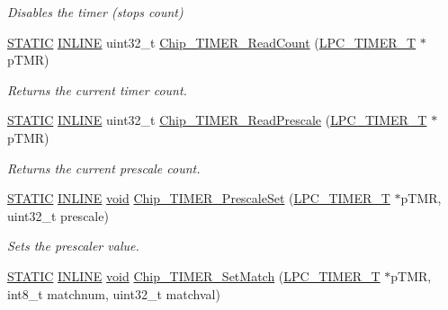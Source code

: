 \begin{DoxyCompactItemize}
\begin{DoxyCompactList}\small\item\em Disables the timer (stops count) \end{DoxyCompactList}\item 
\hyperlink{group__LPC__Types__Public__Macros_ga10b2d890d871e1489bb02b7e70d9bdfb}{S\-T\-A\-T\-I\-C} \hyperlink{group__LPC__Types__Public__Types_ga2eb6f9e0395b47b8d5e3eeae4fe0c116}{I\-N\-L\-I\-N\-E} uint32\-\_\-t \hyperlink{group__TIMER__17XX__40XX_ga6050d4da70d679696b3af922b8c1a6ac}{Chip\-\_\-\-T\-I\-M\-E\-R\-\_\-\-Read\-Count} (\hyperlink{structLPC__TIMER__T}{L\-P\-C\-\_\-\-T\-I\-M\-E\-R\-\_\-\-T} $\ast$p\-T\-M\-R)
\begin{DoxyCompactList}\small\item\em Returns the current timer count. \end{DoxyCompactList}\item 
\hyperlink{group__LPC__Types__Public__Macros_ga10b2d890d871e1489bb02b7e70d9bdfb}{S\-T\-A\-T\-I\-C} \hyperlink{group__LPC__Types__Public__Types_ga2eb6f9e0395b47b8d5e3eeae4fe0c116}{I\-N\-L\-I\-N\-E} uint32\-\_\-t \hyperlink{group__TIMER__17XX__40XX_ga52328278a0f1326c6ce7dc210ad010d3}{Chip\-\_\-\-T\-I\-M\-E\-R\-\_\-\-Read\-Prescale} (\hyperlink{structLPC__TIMER__T}{L\-P\-C\-\_\-\-T\-I\-M\-E\-R\-\_\-\-T} $\ast$p\-T\-M\-R)
\begin{DoxyCompactList}\small\item\em Returns the current prescale count. \end{DoxyCompactList}\item 
\hyperlink{group__LPC__Types__Public__Macros_ga10b2d890d871e1489bb02b7e70d9bdfb}{S\-T\-A\-T\-I\-C} \hyperlink{group__LPC__Types__Public__Types_ga2eb6f9e0395b47b8d5e3eeae4fe0c116}{I\-N\-L\-I\-N\-E} \hyperlink{Paradigm_2Tern__EE_2small_2portmacro_8h_a14d32f8130d3c0b212cfc751730b5b49}{void} \hyperlink{group__TIMER__17XX__40XX_gaa2483e6483702140e11de3183d5271f9}{Chip\-\_\-\-T\-I\-M\-E\-R\-\_\-\-Prescale\-Set} (\hyperlink{structLPC__TIMER__T}{L\-P\-C\-\_\-\-T\-I\-M\-E\-R\-\_\-\-T} $\ast$p\-T\-M\-R, uint32\-\_\-t prescale)
\begin{DoxyCompactList}\small\item\em Sets the prescaler value. \end{DoxyCompactList}\item 
\hyperlink{group__LPC__Types__Public__Macros_ga10b2d890d871e1489bb02b7e70d9bdfb}{S\-T\-A\-T\-I\-C} \hyperlink{group__LPC__Types__Public__Types_ga2eb6f9e0395b47b8d5e3eeae4fe0c116}{I\-N\-L\-I\-N\-E} \hyperlink{Paradigm_2Tern__EE_2small_2portmacro_8h_a14d32f8130d3c0b212cfc751730b5b49}{void} \hyperlink{group__TIMER__17XX__40XX_gaff98bdf0254cd7783c7b42655fa43cd2}{Chip\-\_\-\-T\-I\-M\-E\-R\-\_\-\-Set\-Match} (\hyperlink{structLPC__TIMER__T}{L\-P\-C\-\_\-\-T\-I\-M\-E\-R\-\_\-\-T} $\ast$p\-T\-M\-R, int8\-\_\-t matchnum, uint32\-\_\-t matchval)

\end{DoxyCompactItemize}
